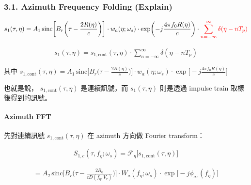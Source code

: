 \documentclass[10pt]{article}
\begin{document}
\hypertarget{azimuth-frequency-folding-explain}{%
\subsubsection{3.1. Azimuth Frequency Folding
(Explain)}\label{azimuth-frequency-folding-explain}}

\begin{equation}
\begin{aligned}
s_1(\tau,\eta) = A_1\,
\mathrm{sinc}\biggl[ B_r\biggl( \tau-\frac{2R(\eta)}{c} \biggr) \biggr]\cdot w_a(\eta;\omega_s)\cdot
\exp\biggl( -j\frac{4\pi f_0R(\eta)}{c} \biggr)\cdot
{\color{red}{\sum_{n=-\infty}^{\infty}\delta(\eta-nT_p)}}
\end{aligned}
\end{equation}

\begin{equation}
\begin{aligned} s_1(\tau,\eta) = s_{1,\mathrm{cont}}(\tau,\eta)\cdot \sum_{n=-\infty}^{\infty}\delta(\eta-nT_p) \end{aligned}
\end{equation}

其中 \(s_{1,\mathrm{cont}}(\tau,\eta) = A_1\, \mathrm{sinc}\biggl[ B_r\biggl( \tau-\frac{2R(\eta)}{c} \biggr) \biggr]\cdot w_a(\eta;\omega_s)\cdot \exp\biggl[ -j\frac{4\pi f_0R(\eta)}{c} \biggr]\)

也就是說， \(s_{1,\mathrm{cont}}(\tau,\eta)\) 是連續訊號，而 \(s_1(\tau,\eta)\) 則是透過 impulse train 取樣後得到的訊號。

\hypertarget{azimuth-fft}{%
\paragraph{Azimuth FFT}\label{azimuth-fft}}

先對連續訊號 \(s_{1,\mathrm{cont}}(\tau,\eta)\) 在 azimuth 方向做
Fourier transform：

\begin{equation}
\begin{aligned} S_{1,c}(\tau,f_\eta;\omega_s) = \mathcal{F}_{\eta}\biggl[ s_{1,\mathrm{cont}}(\tau,\eta) \biggr] \end{aligned}
\end{equation}

\begin{equation}
\begin{aligned}
= A_2\,
\mathrm{sinc}\biggl[ B_r\biggl( \tau-\frac{2R_0}{cD(f_\eta,V_r)} \biggr) \biggr]\cdot W_a(f_\eta;\omega_s)\cdot
\exp\biggl[-j\phi_{az}(f_\eta)\biggr]
\end{aligned}
\end{equation}
\end{document}
